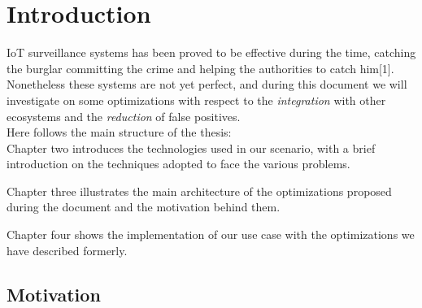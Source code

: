 \chapter{Introduction}

IoT surveillance systems has been proved to be effective during the time,
catching the burglar committing the crime and helping the authorities to
catch him[1]. Nonetheless these systems are not yet perfect, and during
this document we will investigate on some optimizations with respect to
the \textit{integration} with other ecosystems and the \textit{reduction}
of false positives.\\
Here follows the main structure of the thesis:\\

Chapter two introduces the technologies used in our scenario, with a brief
introduction on the techniques adopted to face the various problems.

Chapter three illustrates the main architecture of the optimizations proposed
during the document and the motivation behind them.

Chapter four shows the implementation of our use case with the optimizations
we have described formerly.


\section{Motivation}

